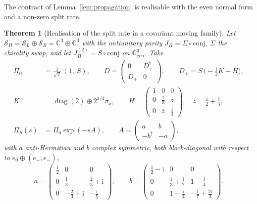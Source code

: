 \documentclass[11pt]{article}
\newtheorem{theorem}{Theorem}
\theoremstyle{definition}
\theoremstyle{remark}
\newcommand{\JPi}{J_{\Pi}}
\newcommand{\Cgen}{\mathbb{C}^{3}_{\mathrm{gen}}}
\newcommand{\PiS}{\Pi_{S}}
\newcommand{\Sbundle}{\mathcal{S}_{\Pi}}
\newcommand{\diag}{\operatorname{diag}}
\begin{document}
    The contract of Lemma~\ref{lem:propagation} is realisable with the even normal form and a non-zero split rate.

    \begin{theorem}[Realisation of the split rate in a covariant moving family]
      \label{thm:realisation}
      Let $\Sbundle = \mathcal{S}_L \oplus \mathcal{S}_R = \mathbb{C}^3 \oplus \mathbb{C}^3$ with the antiunitary parity
      $\JPi = \Sigma \circ \mathrm{conj}$, $\Sigma$ the chirality swap, and let $\JPi^{(2)} = S \circ \mathrm{conj}$ on
      $\Cgen$.
      Take
      \begin{align}
        \label{eq:witness}
        \Pi_0 &= \tfrac{1}{\sqrt 2}\,(1,\ S),
        \qquad
        D = \begin{pmatrix} 0 & D_+^{\dagger} \\ D_+ & 0 \end{pmatrix},
        \qquad
        D_+ = S\,\bigl(-\tfrac{\mathrm{i}}{2}K + H\bigr), \\
        K &= \diag(2) \oplus 2^{3/4}\sigma_x,
        \qquad
        H = \begin{pmatrix} 1 & 0 & 0 \\ 0 & \tfrac13 & z \\ 0 & \overline{z} & \tfrac13 \end{pmatrix},
        \quad z = \tfrac12 + \tfrac{\mathrm{i}}{3}, \nonumber \\
        \PiS(s) &= \Pi_0 \exp(-sA),
        \qquad
        A = \begin{pmatrix} a & b \\ -b^{\dagger} & -\overline{a} \end{pmatrix}, \nonumber
      \end{align}
      with $a$ anti-Hermitian and $b$ complex symmetric, both block-diagonal with respect to $e_0 \oplus (e_+, e_-)$,
      \[
        a = \begin{pmatrix} \tfrac{\mathrm{i}}{2} & 0 & 0 \\ 0 & \tfrac{\mathrm{i}}{3} & \tfrac23 + \mathrm{i} \\
          0 & -\tfrac23 + \mathrm{i} & -\tfrac{\mathrm{i}}{5} \end{pmatrix},
        \qquad
        b = \begin{pmatrix} \tfrac12 - \mathrm{i} & 0 & 0 \\ 0 & \tfrac13 + \tfrac{\mathrm{i}}{2} & 1 -
        \tfrac{\mathrm{i}}{4} \\
          0 & 1 - \tfrac{\mathrm{i}}{4} & -\tfrac17 + \tfrac{2\mathrm{i}}{3} \end{pmatrix}.
\]
\end{theorem}
\end{document}

